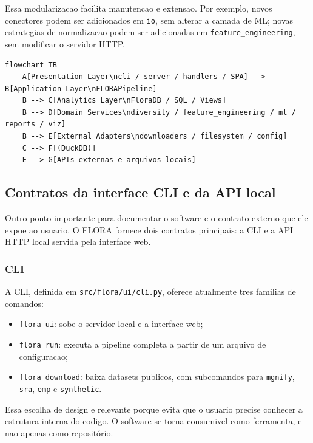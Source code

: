 \documentclass[12pt,a4paper]{article}
\begin{document}
Essa modularizacao facilita manutencao e extensao. Por exemplo, novos conectores podem ser adicionados em \texttt{io}, sem alterar a camada de ML; novas estrategias de normalizacao podem ser adicionadas em \texttt{feature\_engineering}, sem modificar o servidor HTTP.

\begin{lstlisting}[style=mermaid,caption={Diagrama Mermaid das camadas de software do FLORA.},label={lst:mermaid_layers}]
flowchart TB
    A[Presentation Layer\ncli / server / handlers / SPA] --> B[Application Layer\nFLORAPipeline]
    B --> C[Analytics Layer\nFloraDB / SQL / Views]
    B --> D[Domain Services\ndiversity / feature_engineering / ml / reports / viz]
    B --> E[External Adapters\ndownloaders / filesystem / config]
    C --> F[(DuckDB)]
    E --> G[APIs externas e arquivos locais]
\end{lstlisting}

\subsection{Contratos da interface CLI e da API local}

Outro ponto importante para documentar o software e o contrato externo que ele expoe ao usuario. O FLORA fornece dois contratos principais: a CLI e a API HTTP local servida pela interface web.

\subsubsection{CLI}

A CLI, definida em \texttt{src/flora/ui/cli.py}, oferece atualmente tres familias de comandos:

\begin{itemize}[leftmargin=1.5cm]
    \item \texttt{flora ui}: sobe o servidor local e a interface web;
    \item \texttt{flora run}: executa a pipeline completa a partir de um arquivo de configuracao;
    \item \texttt{flora download}: baixa datasets publicos, com subcomandos para \texttt{mgnify}, \texttt{sra}, \texttt{emp} e \texttt{synthetic}.
\end{itemize}

Essa escolha de design e relevante porque evita que o usuario precise conhecer a estrutura interna do codigo. O software se torna consumivel como ferramenta, e nao apenas como repositório.
\end{document}
